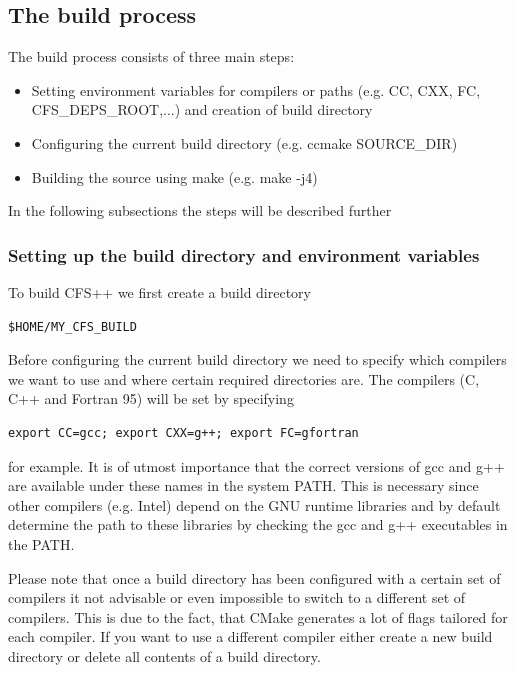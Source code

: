 \subsection{The build process}

The build process consists of three main steps:

\begin{itemize}
    \item Setting environment variables for compilers or paths (e.g. CC, CXX, FC, CFS\_DEPS\_ROOT,...) and creation of build directory
    \item Configuring the current build directory (e.g. ccmake SOURCE\_DIR)
    \item Building the source using make (e.g. make -j4) 
\end{itemize}

In the following subsections the steps will be described further

\subsubsection{Setting up the build directory and environment variables}

To build CFS++ we first create a build directory

\begin{verbatim}
$HOME/MY_CFS_BUILD
\end{verbatim}

Before configuring the current build directory we need to specify which compilers we want to use and where certain required directories are. The compilers (C, C++ and Fortran 95) will be set by specifying

\begin{verbatim}
export CC=gcc; export CXX=g++; export FC=gfortran
\end{verbatim}

for example. It is of utmost importance that the correct versions of gcc and g++ are available under these names in the system PATH. This is necessary since other compilers (e.g. Intel) depend on the GNU runtime libraries and by default determine the path to these libraries by checking the gcc and g++ executables in the PATH.

Please note that once a build directory has been configured with a certain set of compilers it not advisable or even impossible to switch to a different set of compilers. This is due to the fact, that CMake generates a lot of flags tailored for each compiler. If you want to use a different compiler either create a new build directory or delete all contents of a build directory.

